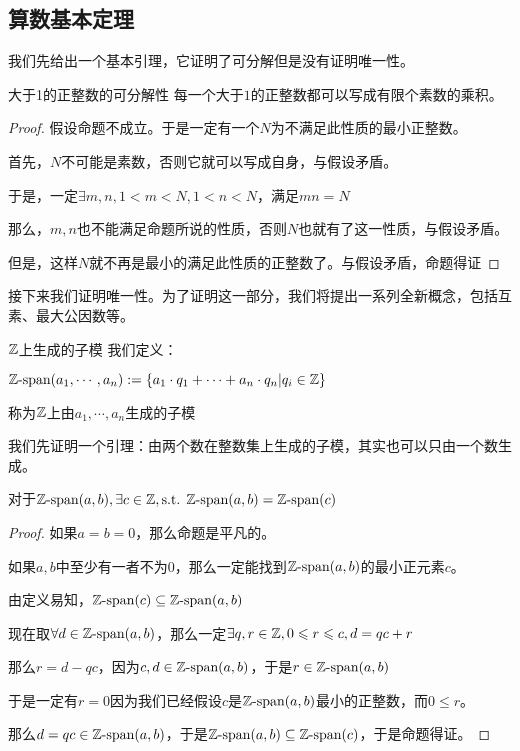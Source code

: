\documentclass[12pt, a4paper, oneside, UTF8]{ctexbook}
\begin{document}
		\subsection{算数基本定理}
			我们先给出一个基本引理，它证明了可分解但是没有证明唯一性。
			\begin{lemma}{大于1的正整数的可分解性}{}
				每一个大于$1$的正整数都可以写成有限个素数的乘积。
			\end{lemma}
			\begin{proof}
				假设命题不成立。于是一定有一个$N$为不满足此性质的最小正整数。
				
				首先，$N$不可能是素数，否则它就可以写成自身，与假设矛盾。
				
				于是，一定$\exists m,n,1<m < N,1<n<N$，满足$mn=N$
				
				那么，$m,n$也不能满足命题所说的性质，否则$N$也就有了这一性质，与假设矛盾。
				
				但是，这样$N$就不再是最小的满足此性质的正整数了。与假设矛盾，命题得证
			\end{proof}
			接下来我们证明唯一性。为了证明这一部分，我们将提出一系列全新概念，包括互素、最大公因数等。
			\begin{defn}{$\mathbb{Z}$上生成的子模}{}
				我们定义：
				
				$\mathbb{Z} \text{-span} (a_1,\cdots,a_n) := \{a_1\cdot q_1 +\cdots+a_n\cdot q_n | q_i \in \mathbb{Z}\}$
				
				称为$\mathbb{Z}$上由$a_1,\cdots,a_n$生成的子模
			\end{defn}
			我们先证明一个引理：由两个数在整数集上生成的子模，其实也可以只由一个数生成。
			\begin{lemma}{}{}
				对于$\mathbb{Z}\text{-span}(a,b),\exists c \in \mathbb{Z},\text{s.t. }\mathbb{Z}\text{-span}(a,b)=\mathbb{Z}\text{-span}(c)$
			\end{lemma}
			\begin{proof}
				如果$a=b=0$，那么命题是平凡的。
				
				如果$a,b$中至少有一者不为$0$，那么一定能找到$\mathbb{Z}\text{-span}(a,b)$的最小正元素$c$。
				
				由定义易知，$\mathbb{Z}\text{-span}(c) \subseteq \mathbb{Z}\text{-span}(a,b)$
				
				现在取$\forall d \in \mathbb{Z}\text{-span}(a,b)$，那么一定$\exists q,r \in \mathbb{Z},0 \leqslant r \leqslant c,d=qc+r$
				
				那么$r=d-qc$，因为$c,d\in \mathbb{Z}\text{-span}(a,b)$，于是$r \in \mathbb{Z}\text{-span}(a,b)$
				
				于是一定有$r=0$因为我们已经假设$c$是$\mathbb{Z}\text{-span}(a,b)$最小的正整数，而$0 \leqslant r$。
				
				那么$d=qc \in \mathbb{Z}\text{-span}(a,b)$，于是$\mathbb{Z}\text{-span}(a,b) \subseteq \mathbb{Z}\text{-span}(c)$，于是命题得证。
			\end{proof}
\end{document}
